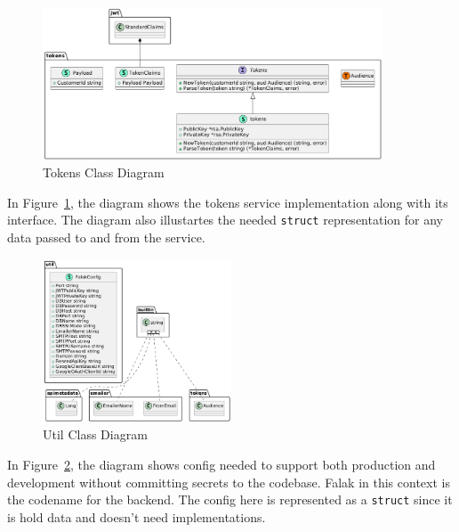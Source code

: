 \begin{figure}[!h]
    \centering
    \includegraphics[width=0.9\textwidth]{images/docs/diagrams/class/class-diagram/tokens.png}
    \caption{Tokens Class Diagram}
    \label{fig:tokens-class-diagram}
\end{figure}

In Figure~\ref{fig:tokens-class-diagram}, the diagram shows the tokens service implementation along with its interface. The diagram also illustartes the needed \texttt{struct} representation for any data passed to and from the service.

\newpage

\begin{figure}[!h]
    \centering
    \includegraphics[width=0.5\textwidth]{images/docs/diagrams/class/class-diagram/util.png}
    \caption{Util Class Diagram}
    \label{fig:util-class-diagram}
\end{figure}

In Figure~\ref{fig:util-class-diagram}, the diagram shows config needed to support both production and development without committing secrets to the codebase. Falak in this context is the codename for the backend. The config here is represented as a \texttt{struct} since it is hold data and doesn't need implementations.